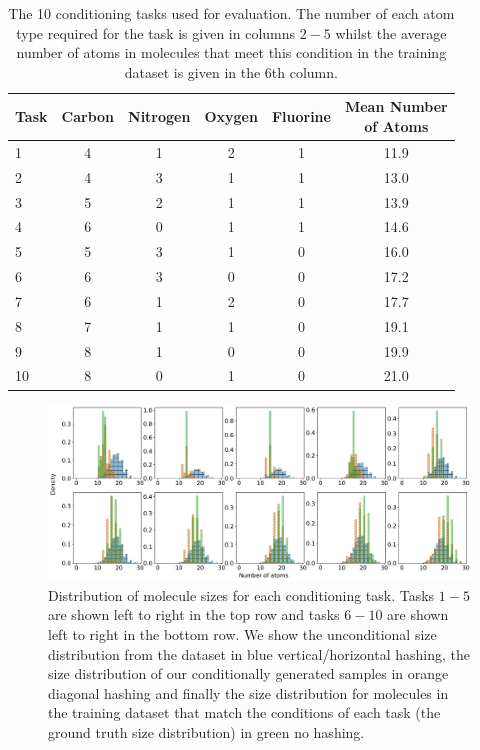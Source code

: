 \begin{table}[ht]
     \centering
   \caption{The 10 conditioning tasks used for evaluation. The number of each atom type required for the task is given in columns $2-5$ whilst the average number of atoms in molecules that meet this condition in the training dataset is given in the $6$th column.}
   \begin{tabular}{@{}lccccc@{}}
     \toprule
     Task & Carbon & Nitrogen & Oxygen & Fluorine & \shortstack{Mean Number \\ of Atoms} \\ \midrule
     1 & 4 & 1 & 2 & 1 & 11.9 \\
     2 & 4 & 3 & 1 & 1 & 13.0 \\
     3 & 5 & 2 & 1 & 1 & 13.9 \\
     4 & 6 & 0 & 1 & 1 & 14.6\\
     5 & 5 & 3 & 1 & 0 & 16.0\\
     6 & 6 & 3 & 0 & 0 & 17.2\\
     7 & 6 & 1 & 2 & 0 & 17.7\\
     8 & 7 & 1 & 1 & 0 & 19.1\\
     9 & 8 & 1 & 0 & 0 & 19.9\\
     10 & 8 & 0 & 1 & 0 & 21.0\\ \bottomrule
   \end{tabular}
   \label{tab:molecule_conditions}
\end{table}

\begin{figure}
    \centering
    \includegraphics[width=\textwidth]{figs/tddm/cond_dims.pdf}
    \caption{Distribution of molecule sizes for each conditioning task. Tasks $1-5$ are shown left to right in the top row and tasks $6-10$ are shown left to right in the bottom row. We show the unconditional size distribution from the dataset in blue vertical/horizontal hashing, the size distribution of our conditionally generated samples in orange diagonal hashing and finally the size distribution for molecules in the training dataset that match the conditions of each task (the ground truth size distribution) in green no hashing.}
    \label{fig:tddm-apdx_CondDims}
\end{figure}




